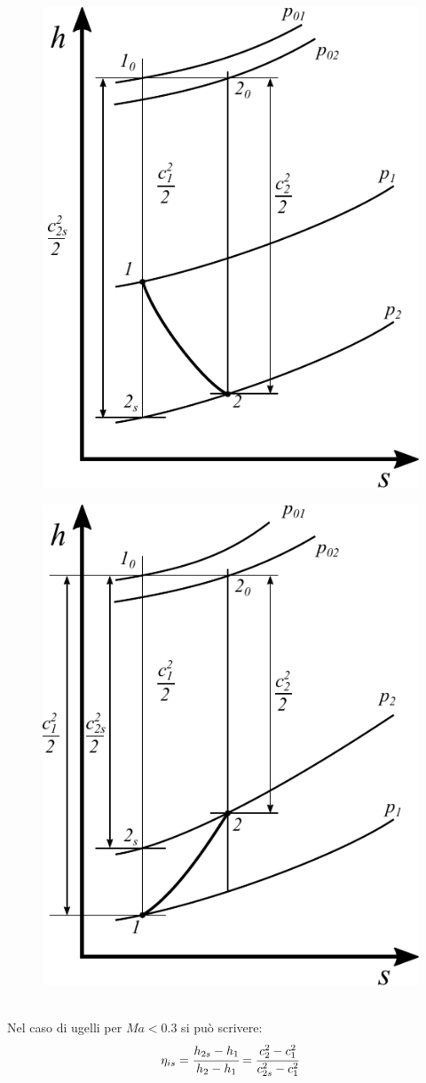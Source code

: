 \begin{figure}
\centering
\begin{minipage}{.5\textwidth}
  \centering
  \includegraphics[width=.6\linewidth]{fig/Ugello.pdf}
  \label{}
\end{minipage}%
\begin{minipage}{.5\textwidth}
  \centering
  \includegraphics[width=.6\linewidth]{fig/Diffusore.pdf}
  \label{}
\end{minipage}
\end{figure}
\\Nel caso di ugelli per $Ma < 0.3$ si può scrivere:
\begin{align*}
\eta_{is} = \cfrac{h_{2s} - h_1}{h_2-h_1} = \cfrac{c_2^2 - c_1^2}{c_{2s}^2 - c_1^2}
\end{align*}
